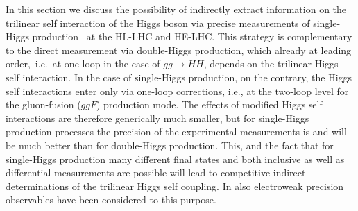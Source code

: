 \documentclass[../report.tex]{subfiles}
\providecommand{\main}{..}
\begin{document}
\label{sec:THanetal}


\label{sec:HH_HE_atlas}




\label{sec:HH_indirect}

In this section we discuss the possibility of indirectly extract information on the trilinear self interaction of the Higgs boson via precise measurements of single-Higgs production~\cite{McCullough:2013rea,Gorbahn:2016uoy,Degrassi:2016wml,Bizon:2016wgr,DiVita:2017eyz,Barklow:2017awn,Maltoni:2017ims,DiVita:2017vrr,Maltoni:2018ttu} at the HL-LHC and HE-LHC. This strategy is complementary to the direct measurement via double-Higgs production, which already at leading order,~i.e.~at one loop in the case of $gg \to HH$, depends on the trilinear Higgs self interaction. In the case of single-Higgs production, on the contrary, the Higgs self interactions enter only via one-loop corrections, i.e., at the two-loop level for the gluon-fusion ($ggF$) production mode. The effects of modified Higgs self interactions are therefore generically much smaller, but for single-Higgs production processes the precision of the experimental measurements is and will be much better than for double-Higgs production. This, and the fact that for single-Higgs production many different final states and both inclusive as well as  differential measurements are possible will lead to competitive indirect determinations of the trilinear Higgs self coupling. In \cite{Degrassi:2017ucl,Kribs:2017znd} also electroweak precision observables have been considered to this purpose.



\label{sec:CMS_HH_indirect}


\end{document}
